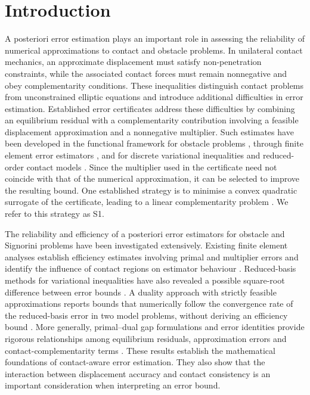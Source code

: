 
\section{Introduction}\label{sec:intro}

A posteriori error estimation plays an important role in assessing the reliability of numerical approximations to contact and obstacle problems.
In unilateral contact mechanics, an approximate displacement must satisfy non-penetration constraints, while the associated contact forces must
remain nonnegative and obey complementarity conditions. These inequalities distinguish contact problems from unconstrained elliptic equations and
introduce additional difficulties in error estimation. Established error certificates address these difficulties by combining an equilibrium
residual with a complementarity contribution involving a feasible displacement approximation and a nonnegative multiplier. Such estimates have
been developed in the functional framework for obstacle problems \cite{repin2000,repin2007}, through finite element error estimators
\cite{veeser2001,braess2005,krause2015}, and for discrete variational inequalities and reduced-order contact models
\cite{zhang2016cr,zhang2016thesis}. Since the multiplier used in the certificate need not coincide with that of the numerical approximation, it
can be selected to improve the resulting bound. One established strategy is to minimise a convex quadratic surrogate of the certificate, leading
to a linear complementarity problem \cite{repin2007,zhang2016thesis}. We refer to this strategy as S1.

The reliability and efficiency of a posteriori error estimators for obstacle and Signorini problems have been investigated extensively. Existing
finite element analyses establish efficiency estimates involving primal and multiplier errors and identify the influence of contact regions on
estimator behaviour \cite{veeser2001,braess2005,krause2015}. Reduced-basis methods for variational inequalities have also revealed a possible
square-root difference between error bounds \cite{haasdonk2012}. A duality approach with strictly feasible approximations reports bounds that numerically follow the convergence rate of the reduced-basis error in two model problems, without deriving an efficiency bound \cite{zhang2014arxiv}. More generally, primal--dual gap formulations and error identities provide rigorous
relationships among equilibrium residuals, approximation errors and contact-complementarity terms \cite{bartels2025,repin2018}. These results
establish the mathematical foundations of contact-aware error estimation. They also show that the interaction between displacement accuracy and
contact consistency is an important consideration when interpreting an error bound.

